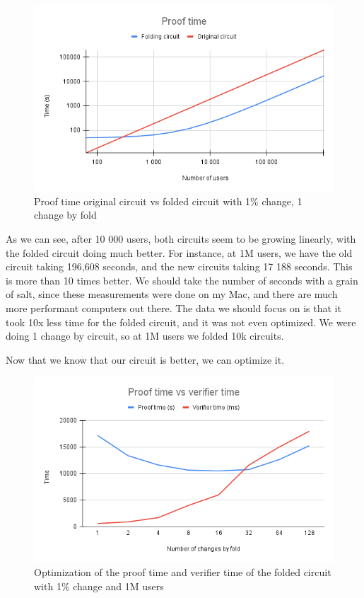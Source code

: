 \begin{figure}[H]
   \centering
   \includegraphics[width=130mm]{Proof time.png}
   \caption{Proof time original circuit vs folded circuit with 1\% change, 1 change by fold}
   \label{overflow}
   \end{figure}

As we can see, after 10 000 users, both circuits seem to be growing linearly, with the folded circuit doing much better. For instance,
at 1M users, we have the old circuit taking 196,608 seconds, and the new circuits taking 17 188 seconds. This is more than 10 times better.
We should take the number of seconds with a grain of salt, since these measurements were done on my Mac, and there are much more performant computers out there.
The data we should focus on is that it took 10x less time for the folded circuit, and it was not even optimized. We were doing 1 change by circuit, so at 1M users we folded 10k circuits.

Now that we know that our circuit is better, we can optimize it.

\begin{figure}[H]
   \centering
   \includegraphics[width=130mm]{Proof time vs verifier time.png}
   \caption{Optimization of the proof time and verifier time of the folded circuit with 1\% change and 1M users}
   \label{overflow}
   \end{figure}


